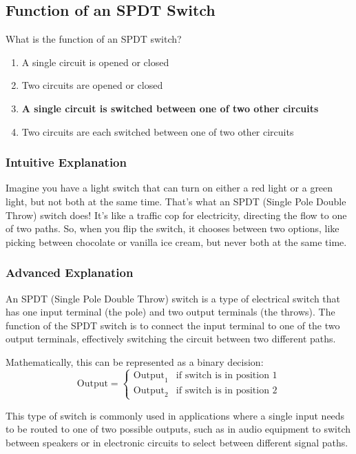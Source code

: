 \subsection{Function of an SPDT Switch}
\label{T6A08}

\begin{tcolorbox}[colback=gray!10!white,colframe=black!75!black,title=T6A08]
What is the function of an SPDT switch?
\begin{enumerate}[label=\Alph*)]
    \item A single circuit is opened or closed
    \item Two circuits are opened or closed
    \item \textbf{A single circuit is switched between one of two other circuits}
    \item Two circuits are each switched between one of two other circuits
\end{enumerate}
\end{tcolorbox}

\subsubsection{Intuitive Explanation}
Imagine you have a light switch that can turn on either a red light or a green light, but not both at the same time. That's what an SPDT (Single Pole Double Throw) switch does! It’s like a traffic cop for electricity, directing the flow to one of two paths. So, when you flip the switch, it chooses between two options, like picking between chocolate or vanilla ice cream, but never both at the same time.

\subsubsection{Advanced Explanation}
An SPDT (Single Pole Double Throw) switch is a type of electrical switch that has one input terminal (the pole) and two output terminals (the throws). The function of the SPDT switch is to connect the input terminal to one of the two output terminals, effectively switching the circuit between two different paths. 

Mathematically, this can be represented as a binary decision:
\[
\text{Output} = 
\begin{cases}
\text{Output}_1 & \text{if switch is in position 1} \\
\text{Output}_2 & \text{if switch is in position 2}
\end{cases}
\]

This type of switch is commonly used in applications where a single input needs to be routed to one of two possible outputs, such as in audio equipment to switch between speakers or in electronic circuits to select between different signal paths.

